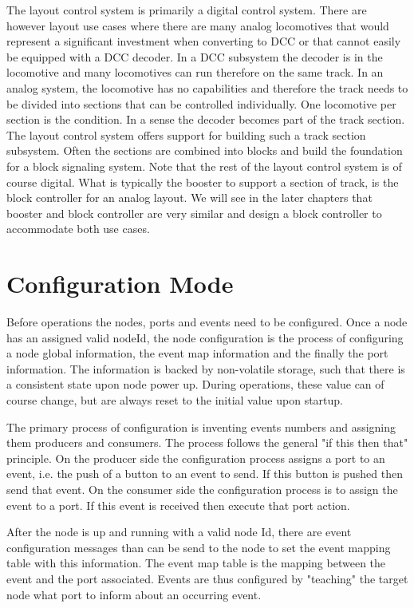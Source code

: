 The layout control system is primarily a digital control system. There are however layout use cases where there are many analog locomotives that would represent a significant investment when converting to DCC or that cannot easily be equipped with a DCC decoder. In a DCC subsystem the decoder is in the locomotive and many locomotives can run therefore on the same track. In an analog system, the locomotive has no capabilities and therefore the track needs to be divided into sections that can be controlled individually. One locomotive per section is the condition. In a sense the decoder becomes part of the track section. The layout control system offers support for building such a track section subsystem. Often the sections are combined into blocks and build the foundation for a block signaling system. Note that the rest of the layout control system is of course digital. What is typically the booster to support a section of track, is the block controller for an analog layout. We will see in the later chapters that booster and block controller are very similar and design a block controller to accommodate both use cases.

\section{Configuration Mode}

Before operations the nodes, ports and events need to be configured. Once a node has an assigned valid nodeId, the node configuration is the process of configuring a node global information, the event map information and the finally the port information. The information is backed by non-volatile storage, such that there is a consistent state upon node power up. During operations, these value can of course change, but are always reset to the initial value upon startup.

The primary process of configuration is inventing events numbers and assigning them producers and consumers. The process follows the general "if this then that" principle. On the producer side the configuration process assigns a port to an event, i.e. the push of a button to an event to send. If this button is pushed then send that event. On the consumer side the configuration process is to assign the event to a port. If this event is received then execute that port action.

After the node is up and running with a valid node Id, there are event configuration messages than can be send to the node to set the event mapping table with this information. The event map table is the mapping between the event and the port associated. Events are thus configured by "teaching" the target node what port to inform about an occurring event.

